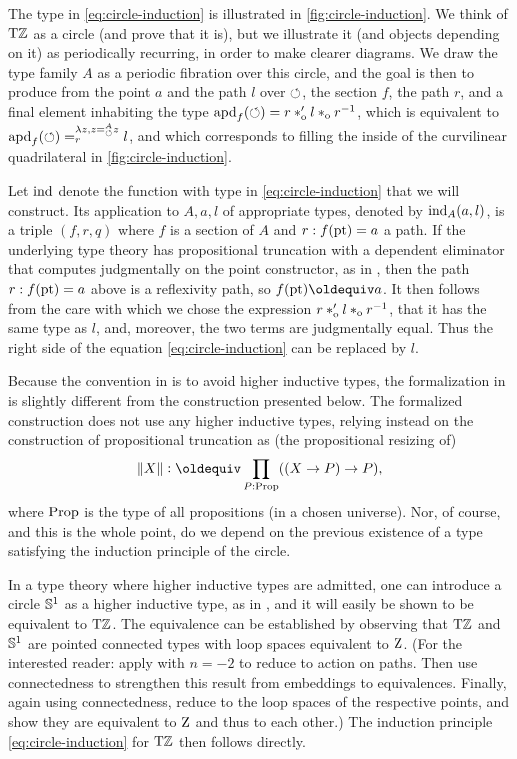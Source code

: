 \documentclass[a4paper,12pt]{amsart}
\begin{document}
The type in \cref{eq:circle-induction} is illustrated in \cref{fig:circle-induction}.
We think of ${\mathrm{T}\mathbb{Z}}$ as a circle (and prove that it is),
but we illustrate it (and objects depending on it) as periodically recurring,
in order to make clearer diagrams.
We draw the type family $A$ as a periodic fibration over this circle,
and the goal is then to produce from the point $a$ and the path $l$ over ${\circlearrowleft}$,
the section $f$, the path $r$, and a final element inhabiting
the type $\mathop{{\mathrm{apd}}_{f}}({\circlearrowleft}) = r*_{\mathrm{o}}' l *_{\mathrm{o}} r^{-1}$, which is equivalent to
$\mathop{{\mathrm{apd}}_{f}}({\circlearrowleft}) =^{\lambda z, z=^A_{{\circlearrowleft}}z}_r l$,
and which corresponds to filling the inside of the curvilinear quadrilateral in \cref{fig:circle-induction}.

Let $\mathop{\mathrm{ind}}$ denote the function with type in \cref{eq:circle-induction} that we will construct.
Its application to $A,a,l$ of appropriate types, denoted by $\mathop{\mathrm{ind}}_A(a,l)$,
is a triple $(f,r,q)$ where $f$ is a section of $A$ and $r : f({\mathord{\mathrm{pt}}})= a$ a path.
If the underlying type theory has propositional truncation with a dependent eliminator
that computes judgmentally on the point constructor, as in \cite[6.9]{hottbook},
then the path $r : f({\mathord{\mathrm{pt}}})= a$ above is a reflexivity path, so $f(\pt)\jdeq a$.
It then follows from the care with which we chose the expression $r*_{\mathrm{o}}' l *_{\mathrm{o}} r^{-1}$,
that it has the same type as $l$, and, moreover, the two terms are judgmentally equal.
Thus the right side of the equation \ref{eq:circle-induction} can be replaced by $l$.

Because the convention in {\UniMath} is to avoid higher inductive types,
the formalization in \cite{circleind-Dan} is
slightly different from the construction presented below.
The formalized construction does not use any higher inductive types,
relying instead on the construction of propositional truncation as
(the propositional resizing of)
$$\Trunc X \defeq \prod_{P:\Prop}((X \to P) \to P),$$
{where $\mathord{\mathrm{Prop}}$ is the type of all propositions (in a chosen universe).}
Nor, of course, and this is the whole point, do we
depend on the previous existence of a type satisfying the induction principle of the circle.

In a type theory where higher inductive types are admitted,
one can introduce a circle ${\mathbb{S}^1}$ as a higher inductive type,
as in \cite[6.1]{hottbook}, and it will easily be shown to be equivalent to ${\mathrm{T}\mathbb{Z}}$.
The equivalence can be established by observing that ${\mathrm{T}\mathbb{Z}}$ and ${\mathbb{S}^1}$
are pointed connected types with loop spaces equivalent to $\mathrm{Z}$.
(For the interested reader: apply \cite[Lemma 7.6.2]{hottbook} with $n=-2$
to reduce to action on paths. Then use connectedness to strengthen
this result from embeddings to equivalences.
Finally, again using connectedness, reduce to the loop spaces
of the respective points, and show they are equivalent to $\mathrm{Z}$ and thus to each other.)
The induction principle \cref{eq:circle-induction} for ${\mathrm{T}\mathbb{Z}}$ then follows directly.
\end{document}
